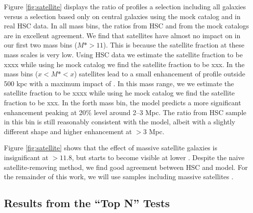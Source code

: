 \documentclass[a4paper,fleqn,usenatbib]{mnras}
\begin{document}
      Figure \ref{fig:satellite} displays the ratio of \dsigma{} profiles a selection including all galaxies versus a selection based only on central galaxies using the mock catalog and in real HSC data. In all mass bins, the  ratios from HSC and from the mock catalogs are in excellent agreement. We find that satellites have almost no impact on \dsigma{} in our first two mass bins ($M*>11$). This is because the satellite fraction at these mass scales is very low. Using HSC data we estimate the satellite fraction to be xxxx while using he mock catalog we find the satellite fraction to be xxx. In the mass bins ($x<M*<x$) satellites lead to a small enhancement of \dsigma{} profile outside 500 kpc with a maximum impact of  . In this mass range, we we estimate the satellite fraction to be xxxx while using he mock catalog we find the satellite fraction to be xxx. In the forth mass bin, the  model predicts a more significant enhancement peaking at 20\% level around 2--3 Mpc.
            The ratio from HSC sample in this bin is still reasonably consistent with the model,
            albeit with a slightly different shape and higher enhancement at $>3$ Mpc.
            
            
 Figure \ref{fig:satellite} shows that  the effect of massive satellite galaxies is insignificant
            at \logmmax{}$>11.8$, but starts to become visible at lower \mmax{}.
            Despite the naive satellite-removing method, we find good agreement between HSC and
            model. For the remainder of this work, we will use  samples including
            massive satellites .

  




\subsection{Results from the ``Top N'' Tests}
    \label{sec:topn_results}
\end{document}
